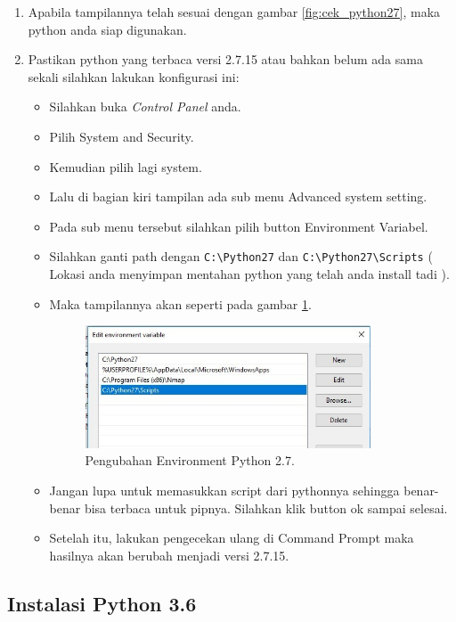 \begin{enumerate}
\item Apabila tampilannya telah sesuai dengan gambar \ref{fig:cek_python27}, maka python anda siap digunakan.
\item Pastikan python yang terbaca versi 2.7.15 atau bahkan belum ada sama sekali silahkan lakukan konfigurasi ini:
\begin{itemize}
\item Silahkan buka \textit{Control Panel} anda.
\item Pilih System and Security.
\item Kemudian pilih lagi system.
\item Lalu  di  bagian  kiri  tampilan  ada  sub menu  Advanced  system setting.
\item Pada  sub  menu  tersebut  silahkan  pilih  button  Environment Variabel.
\item Silahkan ganti path dengan \verb|C:\Python27| dan \verb|C:\Python27\Scripts| ( Lokasi anda menyimpan mentahan python yang telah anda install tadi ).
\item Maka tampilannya akan seperti pada gambar \ref{fig:editenv27}.
\begin{figure}[!htbp]
	\centerline{\includegraphics[width=0.85\textwidth]{figures/8/editenv27.jpg}}
	\caption{Pengubahan Environment Python 2.7.}
	\label{fig:editenv27}
\end{figure}

\item Jangan lupa untuk memasukkan script dari pythonnya sehingga benar-benar bisa terbaca untuk pipnya. Silahkan klik button ok sampai selesai.
\item Setelah itu, lakukan pengecekan ulang di Command Prompt maka hasilnya akan berubah menjadi versi 2.7.15.
\end{itemize}
\end{enumerate}

\subsection{Instalasi Python 3.6}

